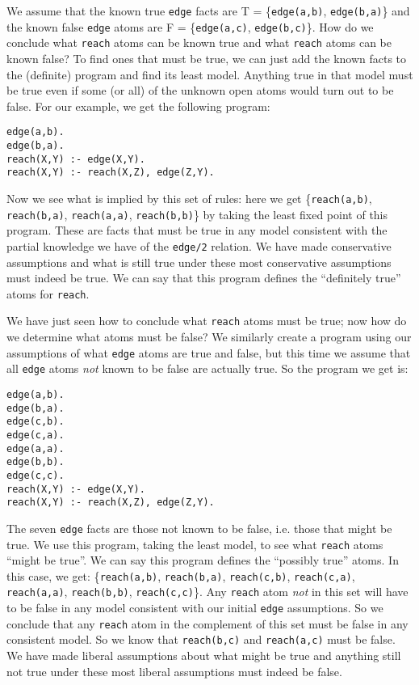 We assume that the known true \verb|edge| facts are T =
\{\verb|edge(a,b)|, \verb|edge(b,a)|\} and the known false \verb|edge|
atoms are F = \{\verb|edge(a,c)|, \verb|edge(b,c)|\}.  How do we
conclude what \verb|reach| atoms can be known true and what
\verb|reach| atoms can be known false?  To find ones that must be
true, we can just add the known facts to the (definite) program and
find its least model.  Anything true in that model must be true even
if some (or all) of the unknown open atoms would turn out to be false.
For our example, we get the following program:
\begin{verbatim}
edge(a,b).
edge(b,a).
reach(X,Y) :- edge(X,Y).
reach(X,Y) :- reach(X,Z), edge(Z,Y).
\end{verbatim}
Now we see what is implied by this set of rules: here we get
\{\verb|reach(a,b)|, \verb|reach(b,a)|, \verb|reach(a,a)|,
\verb|reach(b,b)|\} by taking the least fixed point of this program.
These are facts that must be true in any model consistent with the
partial knowledge we have of the \verb|edge/2| relation.  We have made
conservative assumptions and what is still true under these most
conservative assumptions must indeed be true.  We can say that this
program defines the ``definitely true'' atoms for \verb|reach|.

We have just seen how to conclude what \verb|reach| atoms must be
true; now how do we determine what atoms must be false?  We similarly
create a program using our assumptions of what \verb|edge| atoms are
true and false, but this time we assume that all \verb|edge| atoms
{\em not} known to be false are actually true.  So the program we get
is:
\begin{verbatim}
edge(a,b).
edge(b,a).
edge(c,b).
edge(c,a).
edge(a,a).
edge(b,b).
edge(c,c).
reach(X,Y) :- edge(X,Y).
reach(X,Y) :- reach(X,Z), edge(Z,Y).
\end{verbatim}
The seven \verb|edge| facts are those not known to be false,
i.e. those that might be true.  We use this program, taking the least
model, to see what \verb|reach| atoms ``might be true''.  We can say
this program defines the ``possibly true'' atoms.  In this case, we
get: \{\verb|reach(a,b)|, \verb|reach(b,a)|, \verb|reach(c,b)|,
\verb|reach(c,a)|, \verb|reach(a,a)|, \verb|reach(b,b)|,
\verb|reach(c,c)|\}.  Any \verb|reach| atom {\em not} in this set will
have to be false in any model consistent with our initial \verb|edge|
assumptions.  So we conclude that any \verb|reach| atom in the
complement of this set must be false in any consistent model.  So we
know that \verb|reach(b,c)| and \verb|reach(a,c)| must be false.  We
have made liberal assumptions about what might be true and anything
still not true under these most liberal assumptions must indeed be
false.

